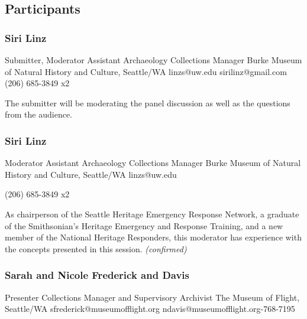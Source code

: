 \documentclass{report}
\begin{document}
            \subsection*{Participants}
              \subsubsection*{ Siri Linz }
              Submitter, Moderator\newline
              Assistant Archaeology Collections Manager\newline
              Burke Museum of Natural History and Culture, Seattle/WA
              \newline
              linzs@uw.edu\newline
              sirilinz@gmail.com\newline
              (206) 685-3849 x2\newline

              The submitter will be moderating the panel discussion as well as the questions from the audience.\newline


              
                \subsubsection*{ Siri Linz }
                Moderator\newline
                Assistant Archaeology Collections Manager\newline
                Burke Museum of Natural History and Culture, Seattle/WA
                \newline
                linzs@uw.edu\newline
                
                (206) 685-3849 x2\newline

                As chairperson of the Seattle Heritage Emergency Response Network, a graduate of the Smithsonian's Heritage Emergency and Response Training, and a new member of the National Heritage Responders, this moderator has experience with the concepts presented in this session.\newline
                \emph{ (confirmed) }
              

              
                \subsubsection*{ Sarah and Nicole Frederick and Davis }
                Presenter\newline
                Collections Manager and Supervisory Archivist\newline
                The Museum of Flight, Seattle/WA
                \newline
                sfrederick@museumofflight.org\newline
                ndavis@museumofflight.org-768-7195\newline
\end{document}
